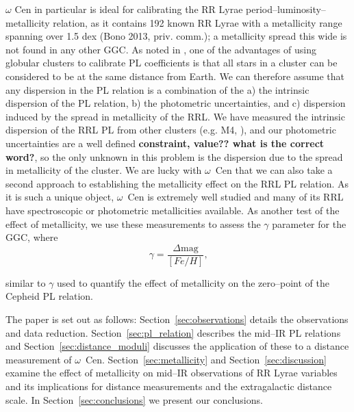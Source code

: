 \documentclass[a4paper,fleqn,usenatbib]{mnras}
\begin{document}
$\omega$ Cen in particular is ideal for calibrating the RR Lyrae period--luminosity--metallicity relation, as it contains 192 known RR Lyrae \citep{2004A&A...424.1101K} with a metallicity range spanning over 1.5 dex (Bono 2013, priv. comm.); a metallicity spread this wide is not found in any other GGC. As noted in \citet{2006MNRAS.372.1675S}, one of the advantages of using globular clusters to calibrate PL coefficients is that all stars in a cluster can be considered to be at the same distance from Earth. We can therefore assume that any dispersion in the PL relation is a combination of the a) the intrinsic dispersion of the PL relation, b) the photometric uncertainties, and c) dispersion induced by the spread in metallicity of the RRL. We have measured the intrinsic dispersion of the RRL PL from other clusters (e.g. M4, \citet{2015arXiv150507858N}), and our photometric uncertainties are a well defined \textbf{constraint, value?? what is the correct word?}, so the only unknown in this problem is the dispersion due to the spread in metallicity of the cluster. We are lucky with $\omega$~Cen that we can also take a second approach to establishing the metallicity effect on the RRL PL relation. As it is such a unique object, $\omega$~Cen is extremely well studied and many of its RRL have spectroscopic or photometric metallicities available. As another test of the effect of metallicity, we use these measurements to assess the $\gamma$ parameter for the GGC, where 
\begin{equation} \label{eqn:gamma}
\gamma = \dfrac {\Delta \text{mag}} {[Fe/H]}\text{,}
\end{equation}

similar to $\gamma$ used to quantify the effect of metallicity on the zero--point of the Cepheid PL relation. 

The paper is set out as follows: Section~\ref{sec:observations} details the observations and data reduction. Section~\ref{sec:pl_relation} describes the mid--IR PL relations and Section~\ref{sec:distance_moduli} discusses the application of these to a distance measurement of  $\omega$~Cen. Section~\ref{sec:metallicity} and Section~\ref{sec:discussion} examine the effect of metallicity on mid--IR observations of RR Lyrae variables and its implications for distance measurements and the extragalactic distance scale. In Section~\ref{sec:conclusions} we present our conclusions.
\end{document}

